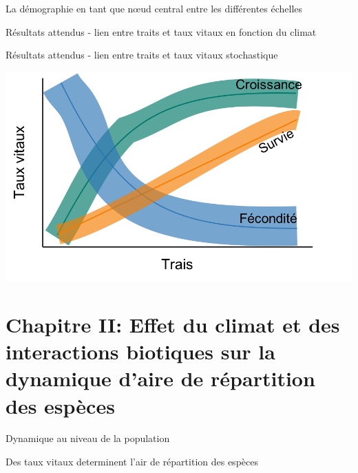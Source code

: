 \documentclass[11pt, compress, aspectratio=1610]{beamer}
\begin{document}
\begin{frame}{La démographie en tant que nœud central entre les
différentes échelles}
\begin{frame}{Résultats attendus - lien entre traits et taux vitaux en
fonction du climat}
\par

\end{frame}

\begin{frame}{Résultats attendus - lien entre traits et taux vitaux
stochastique}
\protect\hypertarget{ruxe9sultats-attendus---lien-entre-traits-et-taux-vitaux-stochastique}{}

\centering

\includegraphics[scale=0.55]{figures/output_chap1b.png}

\par

\end{frame}

\hypertarget{chapitre-ii-effet-du-climat-et-des-interactions-biotiques-sur-la-dynamique-daire-de-ruxe9partition-des-espuxe8ces}{%
\section{\texorpdfstring{Chapitre II: \newline Effet du climat et des
interactions biotiques sur la dynamique d’aire de répartition des
espèces}{Chapitre II: Effet du climat et des interactions biotiques sur la dynamique d’aire de répartition des espèces}}\label{chapitre-ii-effet-du-climat-et-des-interactions-biotiques-sur-la-dynamique-daire-de-ruxe9partition-des-espuxe8ces}}

\begin{frame}{Dynamique au niveau de la population}
\protect\hypertarget{dynamique-au-niveau-de-la-population}{}

Des taux vitaux determinent l’air de répartition des espèces

\centering


\end{frame}
\end{frame}
\end{document}
